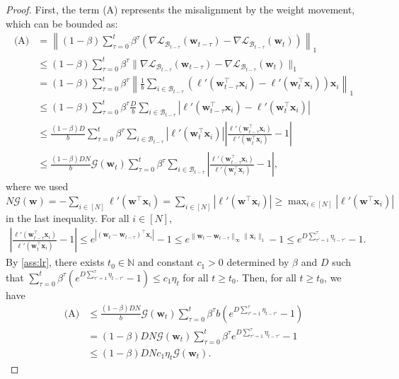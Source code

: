 \documentclass{article} %
\theoremstyle{plain}
\theoremstyle{definition}
\theoremstyle{remark}
\def\gB{{\mathcal{B}}}
\def\gG{{\mathcal{G}}}
\newcommand{\Ls}{\mathcal{L}}
\def\bx{{\mathbf x}}
\def\bw{{\mathbf w}}
\begin{document}
\begin{proof}
    First, the term (A) represents the misalignment by the weight movement, which can be bounded as:
    \begin{align*}
        \textrm{(A)} &= \left\| (1-\beta) \sum_{\tau=0}^t \beta^\tau (\nabla \Ls_{\gB_{t-\tau}} (\bw_{t-\tau}) - \nabla \Ls_{\gB_{t-\tau}} (\bw_t)) \right\|_1 \\
        &\leq (1-\beta) \sum_{\tau=0}^t \beta^\tau \|\nabla \Ls_{\gB_{t-\tau}}(\bw_{t-\tau}) - \nabla \Ls_{\gB_{t-\tau}}(\bw_{t})\|_1 \\
        &= (1-\beta) \sum_{\tau=0}^t \beta^\tau \left\| \frac{1}{b} \sum_{i\in \gB_{t-\tau}}(\ell'(\bw_{t-\tau}^\top \bx_i) - \ell'(\bw_t^\top \bx_i)) \bx_i \right \|_1 \\
        &\leq (1-\beta) \sum_{\tau=0}^t \beta^\tau \frac Db  \sum_{i\in \gB_{t-\tau}} |\ell'(\bw_{t-\tau}^\top \bx_i) - \ell'(\bw_t^\top \bx_i)| \\
        &\leq \frac{(1-\beta) D}{b} \sum_{\tau=0}^t \beta^\tau \sum_{i\in \gB_{t-\tau}} |\ell'(\bw_t^\top \bx_i)| \left| \frac{\ell'(\bw_{t-\tau}^\top \bx_i)}{\ell'(\bw_t^\top \bx_i)} -1 \right| \\
        &\leq \frac{(1-\beta) D N}{b} \gG(\bw_t) \sum_{\tau=0}^t \beta^\tau \sum_{i\in \gB_{t-\tau}} \left| \frac{\ell'(\bw_{t-\tau}^\top \bx_i)}{\ell'(\bw_t^\top \bx_i)} -1 \right|,
    \end{align*}
    where we used $N \gG(\bw) = - \sum_{i\in [N]}\ell'(\bw^\top\bx_i) = \sum_{i\in [N]}|\ell'(\bw^\top\bx_i)| \geq \max_{i\in [N]} |\ell'(\bw^\top \bx_i)|$ in the last inequality.
    For all $i\in [N]$,
    \begin{align*}
        \left| \frac{\ell'(\bw_{t-\tau}^\top \bx_i)}{\ell'(\bw_t^\top \bx_i)} -1 \right| \leq e^{|(\bw_t - \bw_{t-\tau})^\top \bx_i|}-1 \leq e^{\|\bw_t-\bw_{t-\tau}\|_\infty \|\bx_i\|_1}-1 \leq e^{D\sum_{\tau'=1}^{\tau}\eta_{t-\tau'}}-1.
    \end{align*}
    By \cref{ass:lr}, there exists $t_0\in \mathbb N$ and constant $c_1>0$ determined by $\beta$ and $D$ such that $\sum_{\tau=0}^t\beta^\tau (e^{D\sum_{\tau'=1}^\tau \eta_{t-\tau'}}-1) \leq c_1 \eta_t$ for all $t\geq t_0$. Then, for all $t\geq t_0$, we have
    \begin{align*}
        \textrm{(A)} &\leq \frac{(1-\beta) D N}{b} \gG(\bw_t) \sum_{\tau=0}^t \beta^\tau b ( e^{D\sum_{\tau'=1}^{\tau}\eta_{t-\tau'}}-1) \\
        &= (1-\beta) D N  \gG(\bw_t) \sum_{\tau=0}^t \beta^\tau e^{D\sum_{\tau'=1}^{\tau}\eta_{t-\tau'}}-1 \\
        &\leq (1-\beta) D N c_1 \eta_t \gG(\bw_t).    
    \end{align*}
    

\end{proof}
\end{document}
